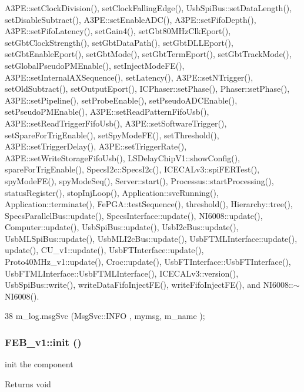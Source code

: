 A3PE::setClockDivision(), setClockFallingEdge(), UsbSpiBus::setDataLength(), setDisableSubtract(), A3PE::setEnableADC(), A3PE::setFifoDepth(), A3PE::setFifoLatency(), setGain4(), setGbt80MHzClkEport(), setGbtClockStrength(), setGbtDataPath(), setGbtDLLEport(), setGbtEnableEport(), setGbtMode(), setGbtTermEport(), setGbtTrackMode(), setGlobalPseudoPMEnable(), setInjectModeFE(), A3PE::setInternalAXSequence(), setLatency(), A3PE::setNTrigger(), setOldSubtract(), setOutputEport(), ICPhaser::setPhase(), Phaser::setPhase(), A3PE::setPipeline(), setProbeEnable(), setPseudoADCEnable(), setPseudoPMEnable(), A3PE::setReadPatternFifoUsb(), A3PE::setReadTriggerFifoUsb(), A3PE::setSoftwareTrigger(), setSpareForTrigEnable(), setSpyModeFE(), setThreshold(), A3PE::setTriggerDelay(), A3PE::setTriggerRate(), A3PE::setWriteStorageFifoUsb(), LSDelayChipV1::showConfig(), spareForTrigEnable(), SpecsI2c::SpecsI2c(), ICECALv3::spiFERTest(), spyModeFE(), spyModeSeq(), Server::start(), Processus::startProcessing(), statusRegister(), stopInjLoop(), Application::svcRunning(), Application::terminate(), FePGA::testSequence(), threshold(), Hierarchy::tree(), SpecsParallelBus::update(), SpecsInterface::update(), NI6008::update(), Computer::update(), UsbSpiBus::update(), UsbI2cBus::update(), UsbMLSpiBus::update(), UsbMLI2cBus::update(), UsbFTMLInterface::update(), update(), CU\_\-v1::update(), UsbFTInterface::update(), Proto40MHz\_\-v1::update(), Croc::update(), UsbFTInterface::UsbFTInterface(), UsbFTMLInterface::UsbFTMLInterface(), ICECALv3::version(), UsbSpiBus::write(), writeDataFifoInjectFE(), writeFifoInjectFE(), and NI6008::$\sim$NI6008().


\begin{DoxyCode}
38 { m_log.msgSvc (MsgSvc::INFO    , mymsg, m_name ); }
\end{DoxyCode}
\hypertarget{classFEB__v1_a70d7d266c7d05fdfab21d5b0293f1ad8}{
\subsubsection[{init}]{ FEB\_\-v1::init ()}}
\label{classFEB__v1_a70d7d266c7d05fdfab21d5b0293f1ad8}
init the component

\begin{DoxyReturn}{Returns}
void 
\end{DoxyReturn}


